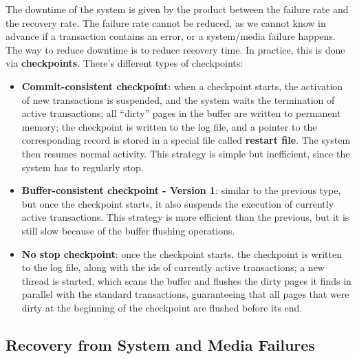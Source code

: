 The downtime of the system is given by the product between the failure rate and the recovery rate. The failure rate cannot be reduced, as we cannot know in advance if a transaction contains an error, or a system/media failure happens. The way to reduce downtime is to reduce recovery time. In practice, this is done via \textbf{checkpoints}. There's different types of checkpoints:
\begin{itemize}
    \item \textbf{Commit-consistent checkpoint}: when a checkpoint starts, the activation of new transactions is suspended, and the system waits the termination of active transactions; all ``dirty'' pages in the buffer are written to permanent memory; the checkpoint is written to the log file, and a pointer to the corresponding record is stored in a special file called \textbf{restart file}. The system then resumes normal activity. This strategy is simple but inefficient, since the system has to regularly stop.

    \item \textbf{Buffer-consistent checkpoint - Version 1}: similar to the previous type, but once the checkpoint starts, it also suspends the execution of currently active transactions. This strategy is more efficient than the previous, but it is still slow because of the buffer flushing operations.

    \item \textbf{No stop checkpoint}: once the checkpoint starts, the checkpoint is written to the log file, along with the ids of currently active transactions; a new thread is started, which scans the buffer and flushes the dirty pages it finds in parallel with the standard transactions, guaranteeing that all pages that were dirty at the beginning of the checkpoint are flushed before its end.
\end{itemize}

\subsection{Recovery from System and Media Failures}


